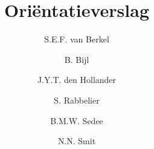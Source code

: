 \documentclass[a4paper]{article}
\title{\casamproject Ori\"{e}ntatieverslag}
\author{S.E.F. van Berkel \and B. Bijl \and J.Y.T. den Hollander \and S. Rabbelier \and B.M.W. Sedee \and N.N. Smit}
\begin{document}
\begin{titlepage}

\maketitle

\thispagestyle{empty}

\end{titlepage}

\setcounter{page}{2}
\setcounter{tocdepth}{2}

\tableofcontents

\newpage









\newpage


\end{document}
